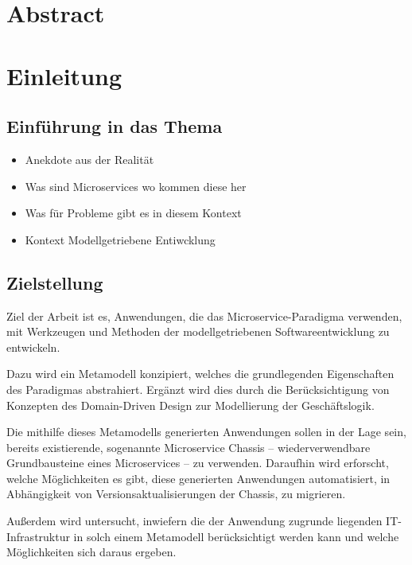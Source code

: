 \chapter{Abstract}

\chapter{Einleitung}

\section{Einführung in das Thema}

\begin{itemize}
\item Anekdote aus der Realität
\item Was sind Microservices wo kommen diese her
\item Was für Probleme gibt es in diesem Kontext
\item Kontext Modellgetriebene Entiwcklung
\end{itemize}

\section{Zielstellung}

Ziel der Arbeit ist es, Anwendungen, die das Microservice-Paradigma verwenden, mit Werkzeugen und Methoden der modellgetriebenen Softwareentwicklung zu entwickeln.

Dazu wird ein Metamodell konzipiert, welches die grundlegenden Eigenschaften des Paradigmas abstrahiert. Ergänzt wird dies durch die Berücksichtigung von Konzepten des Domain-Driven Design zur Modellierung der Geschäftslogik.

Die mithilfe dieses Metamodells generierten Anwendungen sollen in der Lage sein, bereits existierende, sogenannte Microservice Chassis – wiederverwendbare Grundbausteine eines Microservices – zu verwenden. Daraufhin wird erforscht, welche Möglichkeiten es gibt, diese generierten Anwendungen automatisiert, in Abhängigkeit von Versionsaktualisierungen der Chassis, zu migrieren.

Außerdem wird untersucht, inwiefern die der Anwendung zugrunde liegenden IT-Infrastruktur in solch einem Metamodell berücksichtigt werden kann und welche Möglichkeiten sich daraus ergeben.